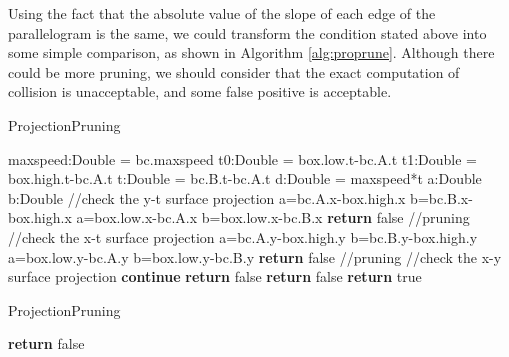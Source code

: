 \documentclass[sigplan]{acmart}
\begin{document}
Using the fact that the absolute value of the slope of each edge of the parallelogram is the same, we could transform the condition stated above into some simple comparison, as shown in Algorithm \ref{alg:proprune}. Although there could be more pruning, we should consider that the exact computation of collision is unacceptable, and some false positive is acceptable.
\begin{algorithm}
\caption{ProjectionPruning} \label{alg:proprune}
\begin{algorithmic}[ht]
    \State maxspeed:Double = bc.maxspeed
    \State t0:Double = box.low.t-bc.A.t
    \State t1:Double = box.high.t-bc.A.t
    \State t:Double = bc.B.t-bc.A.t
    \State d:Double = maxspeed*t
    \State a:Double
    \State b:Double
    \State //check the y-t surface projection
        \State a=bc.A.x-box.high.x
        \State b=bc.B.x-box.high.x
    \Else
        \State a=box.low.x-bc.A.x
        \State b=box.low.x-bc.B.x
    \EndIf
        \State \textbf{return} false //pruning
    \EndIf
    \State //check the x-t surface projection
        \State a=bc.A.y-box.high.y
        \State b=bc.B.y-box.high.y
    \Else
        \State a=box.low.y-bc.A.y
        \State b=box.low.y-bc.B.y
    \EndIf
        \State \textbf{return} false //pruning
    \EndIf
    \State //check the x-y surface projection
            \State \textbf{continue}
    \EndIf
            \State \textbf{return} false
        \EndIf
    \Else
            \State \textbf{return} false
        \EndIf
    \EndIf
    \State \textbf{return} true
\EndFunction
\end{algorithmic}
\end{algorithm}

\begin{algorithm}
\caption{ProjectionPruning} \label{alg:proprune}
\begin{algorithmic}[ht]
        \State \textbf{return} false
    \EndIf
\EndFunction
\end{algorithmic}
\end{algorithm}
\end{document}
